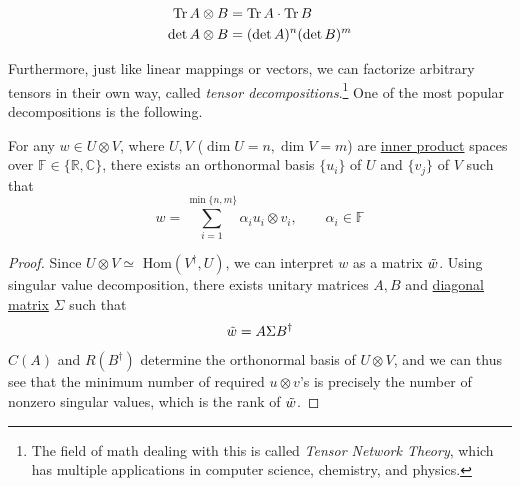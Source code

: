 	\begin{corollary}
	  \label{thm:trace-and-determinant-of-tensor-product}
    \begin{align}
			\operatorname{Tr}{A \otimes B} & = \operatorname{Tr}{A} \cdot \operatorname{Tr}{B} \\
			\det{A \otimes B} & = (\det{A})^n (\det{B})^m
    \end{align}
  \end{corollary}

	Furthermore, just like linear mappings or vectors, we can factorize arbitrary tensors in their own way, called \textit{tensor decompositions}.\footnote{The field of math dealing with this is called \textit{Tensor Network Theory}, which has multiple applications in computer science, chemistry, and physics.} One of the most popular decompositions is the following. 

  \begin{theorem}
    \label{thm:schmidt-decomposition}
    For any $w \in U \otimes V$, where $U, V$ ($\dim{U} = n, \dim{V} = m$)  are \hyperref[def:inner-product]{inner product} spaces over $\mathbb{F} \in \{ \mathbb{R}, \mathbb{C}\}$, there exists an orthonormal basis $\{u_i\}$ of $U$ and $\{v_j\}$ of $V$ such that 
		\begin{equation}
      w = \sum_{i=1}^{\min{\{n, m\}}} \alpha_i u_i \otimes v_i, \qquad \alpha_i \in \mathbb{F}
		\end{equation}
  \end{theorem}
  \begin{proof}
    Since $U \otimes V \simeq $ Hom$(V^\dagger, U)$, we can interpret $w$ as a matrix $\Tilde{w}$. Using singular value decomposition, there exists unitary matrices $A, B$ and \hyperref[def:diagonal-matrix]{diagonal matrix} $\Sigma$ such that
		\begin{equation}
    	\Tilde{w} = A \Sigma B^\dagger
		\end{equation}
    $C(A)$ and $R(B^\dagger)$ determine the orthonormal basis of $U \otimes V$, and we can thus see that the minimum number of required $u \otimes v$'s is precisely the number of nonzero singular values, which is the rank of $\Tilde{w}$. 
  \end{proof}

